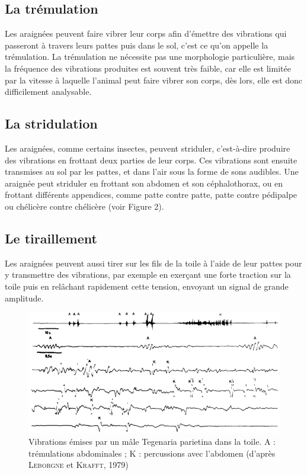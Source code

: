 \subsection{La trémulation}

Les araignées peuvent faire vibrer leur corps afin d'émettre des
vibrations qui passeront à travers leurs pattes puis dans le sol, c'est
ce qu'on appelle la trémulation. La trémulation ne nécessite pas une
morphologie particulière, mais la fréquence des vibrations produites est
souvent très faible, car elle est limitée par la vitesse à laquelle
l'animal peut faire vibrer son corps, dès lors, elle est donc
difficilement analysable.

\subsection{La stridulation}

Les araignées, comme certains insectes, peuvent striduler, c'est-à-dire
produire des vibrations en frottant deux parties de leur corps. Ces
vibrations sont ensuite transmises au sol par les pattes, et dans l'air
sous la forme de sons audibles. Une araignée peut striduler en frottant
son abdomen et son céphalothorax, ou en frottant différents appendices,
comme patte contre patte, patte contre pédipalpe ou chélicère contre
chélicère (voir Figure 2).

\subsection{Le tiraillement}\label{le-tiraillement}

Les araignées peuvent aussi tirer sur les fils de la toile à l'aide de
leur pattes pour y transmettre des vibrations, par exemple en exerçant
une forte traction sur la toile puis en relâchant rapidement cette
tension, envoyant un signal de grande amplitude.

\begin{figure}[htb!]
	\centering
	\includegraphics[width=0.7\linewidth]{../img/vibrations/SignalSpiders}
	\caption{Vibrations émises par un mâle Tegenaria parietina
		dans la toile. A : trémulations abdominales ; K : percussions avec
		l'abdomen (d'après \textsc{Leborgne} et \textsc{Krafft}, 1979)}
	\label{fig:SignalSpiders}
\end{figure}

